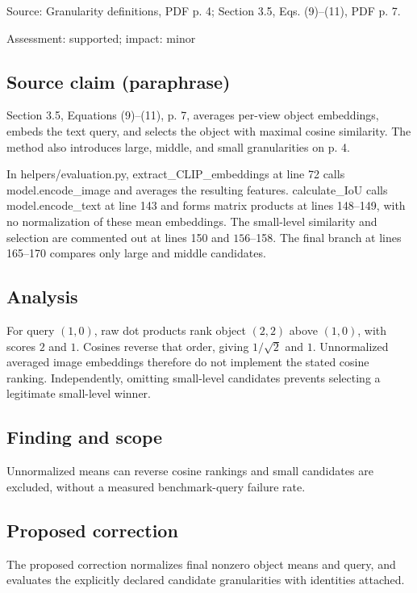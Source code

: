 \documentclass[11pt]{article}
\begin{document}
Source: Granularity definitions, PDF p. 4; Section 3.5, Eqs. (9)–(11), PDF p. 7.

Assessment: supported; impact: minor

\subsection*{Source claim (paraphrase)}

Section 3.5, Equations (9)–(11), p. 7, averages per-view object embeddings, embeds the text query, and selects the object with maximal cosine similarity. The method also introduces large, middle, and small granularities on p. 4.

In helpers/evaluation.py, extract\_CLIP\_embeddings at line 72 calls model.encode\_image and averages the resulting features. calculate\_IoU calls model.encode\_text at line 143 and forms matrix products at lines 148–149, with no normalization of these mean embeddings. The small-level similarity and selection are commented out at lines 150 and \(156\)–158. The final branch at lines 165–170 compares only large and middle candidates.

\subsection*{Analysis}

For query \((1,0)\), raw dot products rank object \((2,2)\) above \((1,0)\), with scores \(2\) and \(1\). Cosines reverse that order, giving \(1/\sqrt2\) and \(1\). Unnormalized averaged image embeddings therefore do not implement the stated cosine ranking. Independently, omitting small-level candidates prevents selecting a legitimate small-level winner.

\subsection*{Finding and scope}

Unnormalized means can reverse cosine rankings and small candidates are excluded, without a measured benchmark-query failure rate.

\subsection*{Proposed correction}

The proposed correction normalizes final nonzero object means and query, and evaluates the explicitly declared candidate granularities with identities attached.
\end{document}
